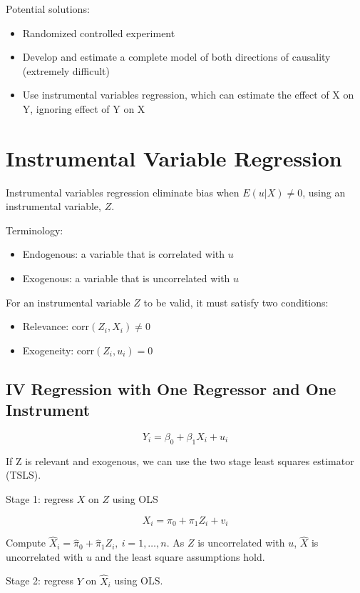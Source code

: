 \documentclass{article}
\begin{document}
Potential solutions:
\begin{itemize}
	\item Randomized controlled experiment
	\item Develop and estimate a complete model of both directions of causality (extremely difficult)
	\item Use instrumental variables regression, which can estimate the effect of X on Y, ignoring effect of Y on X
\end{itemize}

\section{Instrumental Variable Regression}

Instrumental variables regression eliminate bias when $E(u|X) \neq 0$, using an instrumental variable, $Z$.

Terminology:
\begin{itemize}
	\item Endogenous: a variable that is correlated with $u$
	\item Exogenous: a variable that is uncorrelated with $u$
\end{itemize}

For an instrumental variable $Z$ to be valid, it must satisfy two conditions:
\begin{itemize}
	\item Relevance: $\text{corr}(Z_i, X_i) \neq 0$
	\item Exogeneity: $\text{corr}(Z_i, u_i) = 0$
\end{itemize}

\subsection{IV Regression with One Regressor and One Instrument}

\[
	Y_i = \beta_0 + \beta_1 X_i + u_i
\]

If Z is relevant and exogenous, we can use the two stage least squares estimator (TSLS).

Stage 1: regress $X$ on $Z$ using OLS

\[
	X_i = \pi_0 + \pi_1 Z_i + v_i
\]

Compute $\hat{X}_i = \hat{\pi}_0 + \hat{\pi}_1 Z_i, \ i=1, \ldots, n$.
As $Z$ is uncorrelated with $u$, $\hat{X}$ is uncorrelated with $u$
and the least square assumptions hold.

Stage 2: regress $Y$ on $\hat{X}_i$ using OLS.
\end{document}
